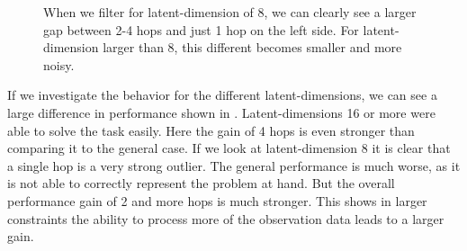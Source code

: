 \begin{figure}[htp]
    \centering
    \hspace{1cm}                       
    \caption{When we filter for latent-dimension of 8, we can clearly see a larger gap between 2-4 hops and just 1 hop on the left side. For latent-dimension larger than 8, this different becomes smaller and more noisy.}
    \label{fig:proof_of_concept_rendezvous_ld}
\end{figure}

If we investigate the behavior for the different latent-dimensions, we can see a large difference in performance shown in . Latent-dimensions 16 or more were able to solve the task easily. Here the gain of 4 hops is even stronger than comparing it to the general case. If we look at latent-dimension 8 it is clear that a single hop is a very strong outlier. The general performance is much worse, as it is not able to correctly represent the problem at hand. But the overall performance gain of 2 and more hops is much stronger. This shows in larger constraints the ability to process more of the observation data leads to a larger gain.


